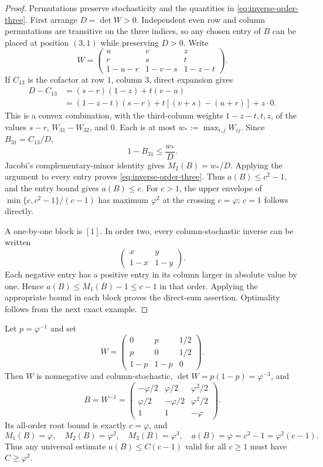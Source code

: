 \begin{proof}
Permutations preserve stochasticity and the quantities in
\eqref{eq:inverse-order-three}.  First arrange
$D=\det W>0$.  Independent even row and column permutations are
transitive on the three indices, so any chosen entry of $B$ can be
placed at position $(3,1)$ while preserving $D>0$.  Write
\[
 W=\begin{pmatrix}
 u&v&z\\r&s&t\\1-u-r&1-v-s&1-z-t
 \end{pmatrix}.
\]
If $C_{13}$ is the cofactor at row $1$, column $3$, direct
expansion gives
\begin{align*}
 D-C_{13}
 &=(s-r)(1-z)+t(v-u)\\
 &=(1-z-t)(s-r)+t[(v+s)-(u+r)]+z\cdot0.
\end{align*}
This is a convex combination, with the third-column weights
$1-z-t,t,z$, of the values
$s-r$, $W_{31}-W_{32}$, and $0$.  Each is at most
$w_*:=\max_{i,j}W_{ij}$.  Since $B_{31}=C_{13}/D$,
\[
 1-B_{31}\leq\frac{w_*}{D}.
\]
Jacobi's complementary-minor identity gives $M_2(B)=w_*/D$.
Applying the argument to every entry proves
\eqref{eq:inverse-order-three}.  Thus $a(B)\leq c^2-1$, and the
entry bound gives $a(B)\leq c$.  For $c>1$, the upper envelope
of $\min\{c,c^2-1\}/(c-1)$ has maximum $\varphi^2$ at the crossing
$c=\varphi$; $c=1$ follows directly.

A one-by-one block is $[1]$.  In order two, every
column-stochastic inverse can be written
\[
 \begin{pmatrix}x&y\\1-x&1-y\end{pmatrix}.
\]
Each negative entry has a positive entry in its column larger in
absolute value by one.  Hence $a(B)\leq M_1(B)-1\leq c-1$ in
that order.  Applying the appropriate bound in each block proves
the direct-sum assertion.  Optimality follows from the next exact
example.
\end{proof}

\begin{proposition}
\label{prop:inverse-golden-example}
Let $p=\varphi^{-1}$ and set
\[
 W=\begin{pmatrix}
 0&p&1/2\\p&0&1/2\\1-p&1-p&0
 \end{pmatrix}.
\]
Then $W$ is nonnegative and column-stochastic,
$\det W=p(1-p)=\varphi^{-3}$, and
\[
 B=W^{-1}=\begin{pmatrix}
 -\varphi/2&\varphi/2&\varphi^2/2\\
 \varphi/2&-\varphi/2&\varphi^2/2\\
 1&1&-\varphi
 \end{pmatrix}.
\]
Its all-order root bound is exactly $c=\varphi$, and
\begin{equation}
 M_1(B)=\varphi,\quad M_2(B)=\varphi^2,\quad
 M_3(B)=\varphi^3,\quad
 a(B)=\varphi=c^2-1=\varphi^2(c-1).
 \label{eq:inverse-golden-equality}
\end{equation}
Thus any universal estimate $a(B)\leq C(c-1)$ valid for all
$c\geq1$ must have $C\geq\varphi^2$.
\end{proposition}

